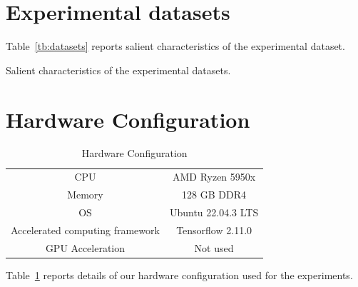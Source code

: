 \documentclass[sigconf,natbib=true, review=true]{acmart} %
\begin{document}
\section{Experimental datasets}
Table~\ref{tb:datasets} reports salient characteristics of the experimental dataset. 
\begin{table}[tb]
\caption{Salient characteristics of the experimental datasets.} \label{tb:datasets}
    \resizebox{\linewidth}{!}{
      
}
\end{table}

\section{Hardware Configuration}
\begin{table}[tb]
    \centering
    
    \begin{tabular}{c|c}
        \toprule
         CPU & AMD Ryzen 5950x  \\
         Memory & 128 GB DDR4 \\ 
         OS & Ubuntu 22.04.3 LTS  \\
         Accelerated computing framework & Tensorflow 2.11.0 \\
         GPU Acceleration & Not used\\
         \bottomrule
    \end{tabular}
    \caption{Hardware Configuration}
    \label{tb:hardware}
\end{table}
Table~\ref{tb:hardware} reports details of our hardware configuration used for the experiments. 
\end{document}
